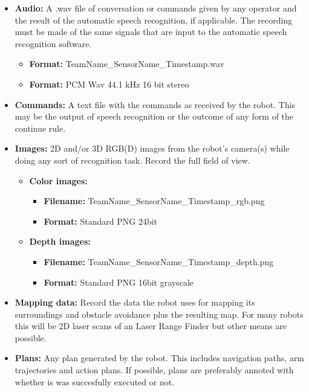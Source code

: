     \begin{itemize}
    \item \textbf{Audio: } A .wav file of conversation or commands given by any operator and the result of the automatic speech recognition, if applicable.
      The recording must be made of the same signals that are input to the automatic speech recognition software. 
      \begin{itemize}
	\item \textbf{Format: } TeamName\_SensorName\_Timestamp.wav
	\item \textbf{Format: } PCM Wav 44.1 kHz 16 bit stereo
      \end{itemize}
      
    \item \textbf{Commands: } A text file with the commands as received by the robot. 
      This may be the output of speech recognition or the outcome of any form of the continue rule.
    
    \item \textbf{Images: } 2D and/or 3D RGB(D) images from the robot's camera(s) while doing any sort of recognition task.
			    Record the full field of view. 
    \begin{itemize}
      \item
	\textbf{Color images: } 
	\begin{itemize}
	  \item \textbf{Filename: } TeamName\_SensorName\_Timestamp\_rgb.png
	  \item \textbf{Format: } Standard PNG 24bit
	\end{itemize}
      \item
	\textbf{Depth images: } 
	\begin{itemize}
	  \item \textbf{Filename: } TeamName\_SensorName\_Timestamp\_depth.png
	  \item \textbf{Format: } Standard PNG 16bit grayscale
	\end{itemize}
    \end{itemize}
    
    \item \textbf{Mapping data: } Record the data the robot uses for mapping its surroundings and obstacle avoidance plus the resulting map. 
      For many robots this will be 2D laser scans of an Laser Range Finder but other means are possible. 
    
    \item \textbf{Plans: } Any plan generated by the robot. This includes navigation paths, arm trajectories and action plans. 
      If possible, plans are preferably annoted with whether is was succesfully executed or not.
    \end{itemize}
    

